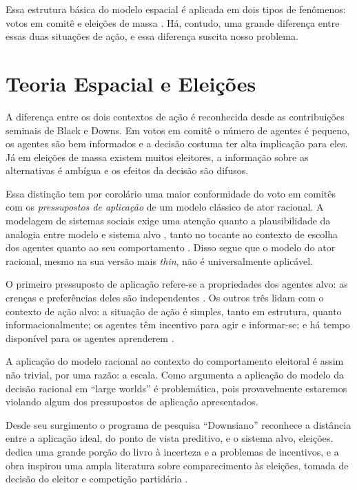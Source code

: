 Essa estrutura básica do modelo espacial é aplicada em dois tipos de fenômenos:
votos em comitê e eleições de massa \cite{munger2015choosing}. Há, contudo, uma
grande diferença entre essas duas situações de ação, e essa diferença suscita
nosso problema.


\section{Teoria Espacial e Eleições}


A diferença entre os dois contextos de ação é reconhecida desde as contribuições
seminais de Black e Downs. Em votos em comitê o número de agentes é pequeno, os
agentes são bem informados e  a decisão costuma ter alta implicação para eles.
Já em eleições de massa existem muitos eleitores, a informação sobre as
alternativas é ambígua e os efeitos da decisão são difusos.

Essa distinção tem por corolário uma maior conformidade do voto em comitês com
os \textit{pressupostos de aplicação} de um modelo clássico de ator racional. A
modelagem de sistemas sociais exige uma atenção quanto a plausibilidade da
analogia entre modelo e sistema alvo \cite{de2005computational}, tanto no
tocante ao contexto de escolha dos agentes quanto ao seu comportamento
\cite{page2008uncertainty}. Disso segue que o modelo do ator racional, mesmo na
sua versão mais \textit{thin}, não é universalmente aplicável.


O primeiro pressuposto de aplicação refere-se a propriedades dos agentes alvo:
as crenças e preferências deles são independentes \cite{binmore2008rational}. Os
outros três lidam com o contexto de ação alvo: a situação de ação é simples,
tanto em estrutura, quanto informacionalmente; os agentes têm incentivo para
agir e informar-se; e há tempo disponível para os agentes aprenderem
\cite{binmore2007work, page2008uncertainty}.

A aplicação do modelo racional ao contexto do comportamento eleitoral é assim
não trivial, por uma razão: a escala. Como argumenta 
a aplicação do modelo da decisão racional em  ``large worlds'' é problemática,
pois provavelmente estaremos violando algum dos pressupostos de aplicação
apresentados.

Desde seu surgimento o programa de pesquisa ``Downsiano'' reconhece a distância
entre a aplicação ideal, do ponto de vista preditivo, e o sistema alvo,
eleições.  dedica uma grande porção do livro à
incerteza e a problemas de incentivos, e a obra inspirou uma ampla literatura
sobre comparecimento às eleições, tomada de decisão do eleitor e competição
partidária \cite{bendor2011behavioral}.

